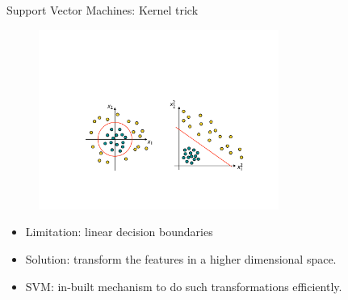 \documentclass[xcolor=pdftex,dvipsnames,table]{beamer}
\begin{document}

\begin{frame}{Support Vector Machines: Kernel trick}
	\begin{figure}[htb]
		\includegraphics[width=0.7\textwidth]{../graphics/KernelTrick.pdf}
	\end{figure}
	\begin{itemize}
		\item Limitation: linear decision boundaries
		\item Solution: transform the features in a higher dimensional space.
		\item SVM: in-built mechanism to do such transformations efficiently.
	\end{itemize}
\end{frame}
\end{document}
